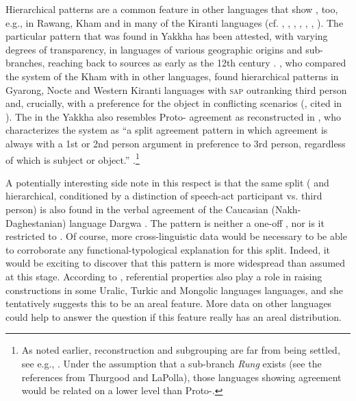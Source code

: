 Hierarchical patterns are a common feature  in other  languages that show , too, e.g., in Rawang, Kham and in many of the Kiranti languages (cf. \citealt[317]{DeLancey1989Verb}, \citealt[311]{LaPolla1992Dating}, \citealt[30]{LaPolla2003_Overview}, \citealt{LaPolla2007Hierarchical}, \citealt[473]{Ebert1987Grammatical}, \citealt[1]{DeLancey2011_Notes}, \citealt[398]{Watters2002A-grammar}). The particular pattern that was found in Yakkha has been attested, with varying degrees of transparency, in  languages of various geographic origins and sub-branches, reaching back to  sources as early as the 12th century \citep{Kepping1975_Subject, Kepping1994The-conjugation}. \citet{Watters2002A-grammar}, who compared the  system of the Kham  with  in other  languages, found hierarchical patterns in Gyarong, Nocte and Western Kiranti languages with \textsc{sap} outranking third person and, crucially, with a preference for the object in conflicting scenarios (\citealt{Nagano1984A-historical}, cited in \citealt[388]{Watters2002A-grammar}). The  in the Yakkha  also resembles Proto- agreement as reconstructed in \citet{DeLancey1989Verb}, who characterizes the system as  “a split  agreement pattern in which agreement is always with a 1st or 2nd person argument in preference to 3rd person, regardless of which is subject or object.” \citep[317]{DeLancey1989Verb}.\footnote{As noted earlier,  reconstruction and subgrouping are far from being settled, see e.g., \citet{Thurgood1984The-Rung, DeLancey1989Verb, DeLancey2010_Towards, DeLancey2011_Notes, LaPolla1992Dating, LaPolla2012_Comments, Jacques2012_Agreement}. Under the assumption that  a sub-branch \emph{Rung} exists (see the references from Thurgood and LaPolla), those  languages showing agreement would be related on a lower level than Proto-.}


A potentially interesting side note in this respect is that the same  split ( and hierarchical, conditioned by a distinction of speech-act participant vs. third person) is also found in the verbal agreement of the Caucasian (Nakh-Daghestanian) language Dargwa \citep[208]{Zuniga2007_From}. The pattern is neither a one-off , nor is it restricted to . Of course, more cross-linguistic data would be necessary to be able to corroborate any functional-typo\-lo\-gic\-al explanation for this  split. Indeed, it would be exciting to discover that this pattern is more widespread than  assumed at this stage. According to \citet{Serdobolskaya2009_Raising}, referential properties also play a role  in raising constructions in some Uralic, Turkic and Mongolic languages languages, and she tentatively suggests this to be an areal feature. More data on other languages could help to answer the question if this feature really has an areal distribution.  


